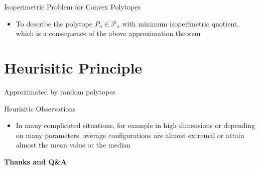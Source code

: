 \documentclass[
  english,            %
  aspectratio=169,    %
]{tumbeamer}
\begin{document}
\begin{frame}{Isoperimetric Problem for Convex Polytopes}
  \begin{itemize}
    \item To describe the polytope $P_{n} \in \mathcal{P}_{n}$ with minimum isoperimetric quotient, which is a consequence of the above approximation theorem
  \end{itemize}
\end{frame}


\section{Heurisitic Principle}
\begin{frame}{Approximated by random polytopes}
    
\end{frame}
\begin{frame}{Heurisitic Observations}
  \begin{itemize}
    \item In many complicated situations, for example in high dimensions or depending on many parameters, average configurations are almost extremal or attain almost the mean value or the median
  \end{itemize}
\end{frame}

\begin{frame}[plain]
  \centering
  \vfill
  {\Huge \textbf{Thanks and Q\&A}}
  \vfill
\end{frame}
\end{document}
